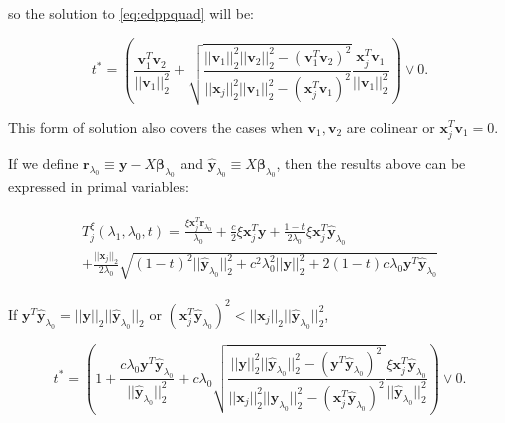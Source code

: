so the solution to \eqref{eq:edppquad} will be:

\begin{equation}
    t^*=\left(\frac{\boldsymbol v_1^T\boldsymbol v_2}{||\boldsymbol v_1||_2^2}+\sqrt{\frac{||\boldsymbol v_1||_2^2||\boldsymbol v_2||_2^2-(\boldsymbol v_1^T\boldsymbol v_2)^2}{||\boldsymbol x_j||_2^2||\boldsymbol v_1||_2^2-(\boldsymbol x_j^T\boldsymbol v_1)^2}}\frac{\boldsymbol x_j^T\boldsymbol v_1}{||\boldsymbol v_1||_2^2}\right)\vee 0.
\end{equation}

This form of solution also covers the cases when $\boldsymbol v_1,\boldsymbol v_2$ are colinear or $\boldsymbol x_j^T \boldsymbol v_1=0$.

If we define $\boldsymbol r_{\lambda_0}\equiv \boldsymbol y-X\boldsymbol\beta_{\lambda_0}$ and $\hat{\boldsymbol y}_{\lambda_0}\equiv X\boldsymbol\beta_{\lambda_0}$, then the results above can be expressed in primal variables:

\begin{gather}
    \begin{aligned}
        T^\xi_j(\lambda_1,\lambda_0,t)= \frac{\xi \boldsymbol x_j^T \boldsymbol r_{\lambda_0}}{\lambda_0}+ \frac{c}{2}\xi\boldsymbol x_j^T \boldsymbol y+\frac{1-t}{2\lambda_0}\xi \boldsymbol x_j^T \hat{\boldsymbol y}_{\lambda_0}\\
        +\frac{||\boldsymbol x_j||_2}{2\lambda_0}\sqrt{(1-t)^2||\hat{\boldsymbol y}_{\lambda_0}||_2^2+c^2\lambda_0^2||\boldsymbol y||_2^2+2(1-t)c\lambda_0 \boldsymbol y^T\hat{\boldsymbol y}_{\lambda_0}}
    \end{aligned}
\end{gather}

If $\boldsymbol y^T \hat{\boldsymbol y}_{\lambda_0}=||\boldsymbol y||_2|| \hat{\boldsymbol y}_{\lambda_0}||_2$ or $(\boldsymbol x_j^T\hat{\boldsymbol y}_{\lambda_0})^2<||\boldsymbol x_j||_2||\hat{\boldsymbol y}_{\lambda_0}||_2^2$,

\begin{equation}
    t^*=\left(1+\frac{c\lambda_0\boldsymbol y^T\hat{\boldsymbol y}_{\lambda_0}}{||\hat{\boldsymbol y}_{\lambda_0}||_2^2}+c\lambda_0\sqrt{\frac{||\boldsymbol y||_2^2||\hat{\boldsymbol y}_{\lambda_0}||_2^2-(\boldsymbol y^T\hat{\boldsymbol y}_{\lambda_0})^2}{||\boldsymbol x_j||_2^2||\hat{\boldsymbol y}_{\lambda_0}||_2^2-(\boldsymbol x_j^T\hat{\boldsymbol y}_{\lambda_0})^2}}\frac{\xi\boldsymbol x_j^T\hat{\boldsymbol y}_{\lambda_0}}{||\hat{\boldsymbol y}_{\lambda_0}||_2^2}\right)\vee 0.
\end{equation}

